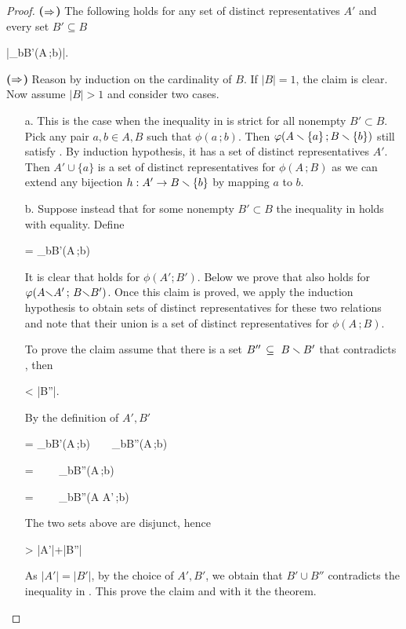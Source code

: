 \documentclass[scombinatorics.tex]{subfiles}
\begin{document}
\begin{proof}
  \textbf{\boldmath($\Rightarrow$)}
  The following holds for any set of distinct representatives $A'$ and every set $B'\subseteq B$  

  {\subseteq}
  {\bigg|\bigcup_{b\in B'}\phi(A\,;b)\bigg|.}

  \textbf{\boldmath($\Rightarrow$)}
  Reason by induction on the cardinality of $B$.
  If $|B|=1$, the claim is clear.
  Now assume $|B|>1$ and consider two cases.

  \begin{itemize}
    \item[a.]
    This is the case when the inequality in  is strict for all nonempty $B'\subset B$. 
    Pick any pair $a,b\in A,B$ such that $\phi(a\,;b)$. 
    Then $\varphi(A\smallsetminus\{a\}\,; B\smallsetminus\{b\})$ still satisfy .
    By induction hypothesis, it has a set of distinct representatives $A'$.
    Then $A'\cup\{a\}$ is a set of distinct representatives for $\phi(A\,;B)$ as we can extend any bijection $h:A'\to B\smallsetminus\{b\}$ by mapping $a$ to $b$. 

    
    \item[b.]
    Suppose instead that for some nonempty $B'\subset B$ the inequality in  holds with equality.
    Define

    {=}
    {\bigcup_{b\in B'}\phi(A\,;b)}
    
    It is clear that  holds for $\phi(A';B')$.
    Below we prove that  also holds for $\varphi(A{\smallsetminus} A'\,;\,{B\smallsetminus} B')$.
    Once this claim is proved, we apply the induction hypothesis to obtain sets of distinct representatives for these two relations and note that their union is a set of distinct representatives for $\phi(A\,;B)$.

    To prove the claim assume that there is a set $B''\,\subseteq\ B\smallsetminus B'$ that contradicts , then

    {<}
    {|B''|.}

    By the definition of $A',B'$

    {=}
    {\bigcup_{b\in B'}\phi(A\,;b)\ \ \cup\ \ \bigcup_{b\in B''}\phi(A\,;b)}

    \ceq{}
    {=}
    {\ \ \cup\ \ \bigcup_{b\in B''}\phi(A\,;b)}

    \ceq{}
    {=}
    {\ \ \cup\ \ \bigcup_{b\in B''}\phi(A{\sm} A'\,;b)}

    The two sets above are disjunct, hence 

    {>}
    {|A'|+|B''|}

    As $|A'|=|B'|$, by the choice of $A',B'$, we obtain that $B'\cup B''$ contradicts the inequality in .
    This prove the claim and with it the theorem.
  \end{itemize}\vspace*{-4ex}
\end{proof}
\end{document}
